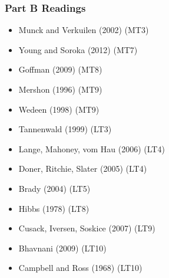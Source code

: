 \begin{frame}

\frametitle{Part B Readings}

\footnotesize

\begin{multicols}{2}
\begin{itemize}
\item Munck and Verkuilen (2002) (MT3)
\item Young and Soroka (2012) (MT7)
\item Goffman (2009) (MT8)
\item Mershon (1996) (MT9)
\item Wedeen (1998) (MT9)
\item Tannenwald (1999) (LT3)
\item Lange, Mahoney, vom Hau (2006) (LT4)
\item Doner, Ritchie, Slater (2005) (LT4)
\item Brady (2004) (LT5)
\item Hibbs (1978) (LT8)
\item Cusack, Iversen, Soskice (2007) (LT9)
\item Bhavnani (2009) (LT10)
\item Campbell and Ross (1968) (LT10)
\end{itemize}
\end{multicols}

\end{frame}



\appendix
\frame{}


